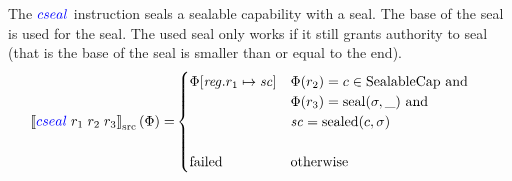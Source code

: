 \documentclass[a4paper]{article}
\newcommand{\sem}[1]{\left\llbracket #1 \right\rrbracket}
\newcommand{\ssem}[2][\Phi]{\sem{#2}_{\mathrm{src}}(#1)}
\newcommand{\sourcecolor}[1]{\color{blue}}
\newcommand{\src}[1]{{\sourcecolor{} #1}}
\newcommand{\zinstr}[1]{#1}
\newcommand{\threeinstr}[4]{
  \ifthenelse{\equal{#2#3#4}{}}
  {\zinstr{#1}}
  {\zinstr{#1} \; #2 \; #3 \; #4}
}
\newcommand{\scseal}[3]{\threeinstr{\src{cseal}}{#1}{#2}{#3}}
\newcommand{\update}[2]{[#1 \mapsto #2]}
\newcommand{\updReg}[2]{\update{\reg.#1}{#2}}
\newcommand{\shareddom}[1]{\mathrm{#1}}
\newcommand{\SealableCaps}{\shareddom{SealableCap}}
\newcommand{\seal}[1]{\shareddom{seal}(#1)}
\newcommand{\sealed}[1]{\shareddom{sealed}(#1)}
\newcommand{\failed}{\mathrm{failed}}
\newcommand{\var}[1]{\mathit{#1}}
\newcommand{\reg}{\var{reg}}
\newcommand{\vsc}{\var{sc}}
\begin{document}
The $\scseal{}{}{}$ instruction seals a sealable capability with a seal. The base of the seal is used for the seal. The used seal only works if it still grants authority to seal (that is the base of the seal is smaller than or equal to the end).
\begin{align*}
  \ssem{\scseal{r_1}{r_2}{r_3}} = & 
                                    \begin{cases}
                                      \Phi\updReg{r_1}{\vsc} & 
                                      \arraycolsep=0pt
                                      \begin{array}[t]{l}
                                        \Phi(r_2) = c \in \SealableCaps \text{ and } \\
                                        \Phi(r_3) = \seal{\sigma,\_} \text{ and } \\
                                        \vsc = \sealed{c,\sigma}
                                      \end{array}\\
                                      & \\
                                      \failed & \text{otherwise}
                                    \end{cases}
\end{align*}
\end{document}
